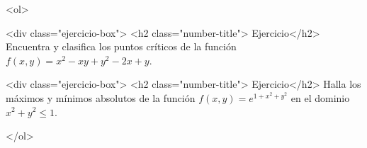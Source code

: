 \documentclass[12pt]{article}
\begin{document}
\bigskip

            
\bigskip
\bigskip
\bigskip






<ol>

<div class="ejercicio-box"> <h2 class="number-title"> Ejercicio</h2> Encuentra y clasifica los puntos críticos de la función $f(x,y)=x^2-xy+y^2-2x+y$.


  \vspace{8cm}


<div class="ejercicio-box"> <h2 class="number-title"> Ejercicio</h2>  Halla los máximos y mínimos absolutos de la función $f(x,y)=e^{1+x^2+y^2}$
en el dominio $x^2+y^2 \leq 1$.

  

</ol>
 





  
\end{document}
